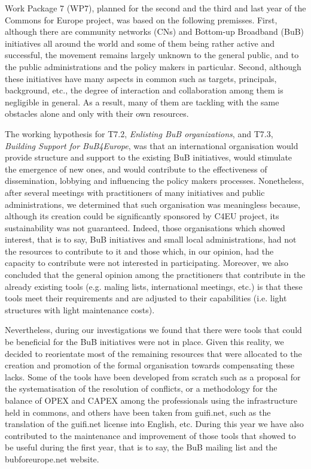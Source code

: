 Work Package 7 (WP7), planned for the second and the third and last year of the Commons for Europe project, was based on the following premisses. First, although there are community networks (CNs) and Bottom-up Broadband (BuB) initiatives all around the world and some of them being rather active and successful, the movement remains largely unknown to the general public, and to the public administrations and the policy makers in particular. Second, although these initiatives have many aspects in common such as targets, principals, background, etc., the degree of interaction and collaboration among them is negligible in general. As a result, many of them are tackling with the same obstacles alone and only with their own resources.

The working hypothesis for T7.2, \emph{Enlisting BuB organizations}, and T7.3, \emph{Building Support for BuB4Europe}, was that an international organisation would provide structure and support to the existing BuB initiatives, would stimulate the emergence of new ones, and would contribute to the effectiveness of dissemination, lobbying and influencing the policy makers processes. Nonetheless, after several meetings with practitioners of many initiatives and public administrations, we determined that such organisation was meaningless because, although its creation could be significantly sponsored by C4EU project, its sustainability was not guaranteed. Indeed, those organisations which showed interest, that is to say, BuB initiatives and small local administrations, had not the resources to contribute to it and those which, in our opinion, had the capacity to contribute were not interested in participating. Moreover, we also concluded that the general opinion among the practitioners that contribute in the already existing tools (e.g. maling lists, international meetings, etc.) is that these tools meet their requirements and are adjusted to their capabilities (i.e. light structures with light maintenance costs).

Nevertheless, during our investigations we found that there were tools that could be beneficial for the BuB initiatives were not in place. Given this reality, we decided to reorientate most of the remaining resources that were allocated to the creation and promotion of the formal organisation towards compensating these lacks. Some of the tools have been developed from scratch such as a proposal for the systematisation of the resolution of conflicts, or a methodology for the balance of OPEX and CAPEX among the professionals using the infrastructure held in commons, and others have been taken from guifi.net, such as the translation of the guifi.net license into English, etc. During this year we have also contributed to the maintenance and improvement of those tools that showed to be useful during the first year, that is to say, the BuB mailing list and the bubforeurope.net website.

